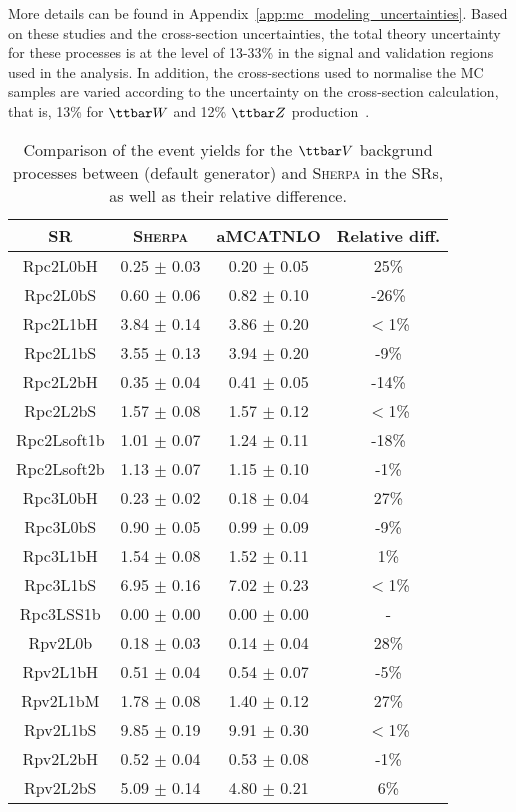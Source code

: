 More details can be found in Appendix~\ref{app:mc_modeling_uncertainties}. 
Based on these studies and the cross-section uncertainties, the total theory uncertainty for these processes is at the level of 13-33\% in the signal and validation regions used in the analysis. 
In addition, the cross-sections used to normalise the MC samples are varied according to the uncertainty on the cross-section calculation, that is, 13\% for $\ttbar W$ and 12\% $\ttbar Z$ production~\cite{Alwall:2014hca}. 


\begin{table}[!htb]
\caption{Comparison of the event yields for the $\ttbar V$ backgrund processes between \AMCATNLO (default generator) and \textsc{Sherpa} in the SRs, as well as their relative difference.
}
\label{tab:ttVGenComp}
\def\arraystretch{1.1}
\centering
\begin{tabular}{|c|c|c|c|}
\hline\hline
   SR    & \textsc{Sherpa} & aMCATNLO & Relative diff.\\ \hline
Rpc2L0bH   &   0.25 $\pm$ 0.03   &   0.20 $\pm$ 0.05   &   25\% \\
Rpc2L0bS   &   0.60 $\pm$ 0.06   &   0.82 $\pm$ 0.10   &   -26\% \\
Rpc2L1bH   &   3.84 $\pm$ 0.14   &   3.86 $\pm$ 0.20   &   $<$1\% \\
Rpc2L1bS   &   3.55 $\pm$ 0.13   &   3.94 $\pm$ 0.20   &   -9\% \\
Rpc2L2bH   &   0.35 $\pm$ 0.04   &   0.41 $\pm$ 0.05   &   -14\% \\
Rpc2L2bS   &   1.57 $\pm$ 0.08   &   1.57 $\pm$ 0.12   &   $<$1\% \\
Rpc2Lsoft1b   &   1.01 $\pm$ 0.07   &   1.24 $\pm$ 0.11   &   -18\% \\
Rpc2Lsoft2b   &   1.13 $\pm$ 0.07   &   1.15 $\pm$ 0.10   &   -1\% \\
Rpc3L0bH   &   0.23 $\pm$ 0.02   &   0.18 $\pm$ 0.04   &   27\% \\
Rpc3L0bS   &   0.90 $\pm$ 0.05   &   0.99 $\pm$ 0.09   &   -9\% \\
Rpc3L1bH   &   1.54 $\pm$ 0.08   &   1.52 $\pm$ 0.11   &   1\% \\
Rpc3L1bS   &   6.95 $\pm$ 0.16   &   7.02 $\pm$ 0.23   &   $<$1\% \\
Rpc3LSS1b   &   0.00 $\pm$ 0.00   &   0.00 $\pm$ 0.00   &   - \\
Rpv2L0b   &   0.18 $\pm$ 0.03   &   0.14 $\pm$ 0.04   &   28\% \\
Rpv2L1bH   &   0.51 $\pm$ 0.04   &   0.54 $\pm$ 0.07   &   -5\% \\
Rpv2L1bM   &   1.78 $\pm$ 0.08   &   1.40 $\pm$ 0.12   &   27\% \\
Rpv2L1bS   &   9.85 $\pm$ 0.19   &   9.91 $\pm$ 0.30   &   $<$1\% \\
Rpv2L2bH   &   0.52 $\pm$ 0.04   &   0.53 $\pm$ 0.08   &   -1\% \\
Rpv2L2bS   &   5.09 $\pm$ 0.14   &   4.80 $\pm$ 0.21   &   6\%  \\
\hline\hline
\end{tabular}
\end{table}

